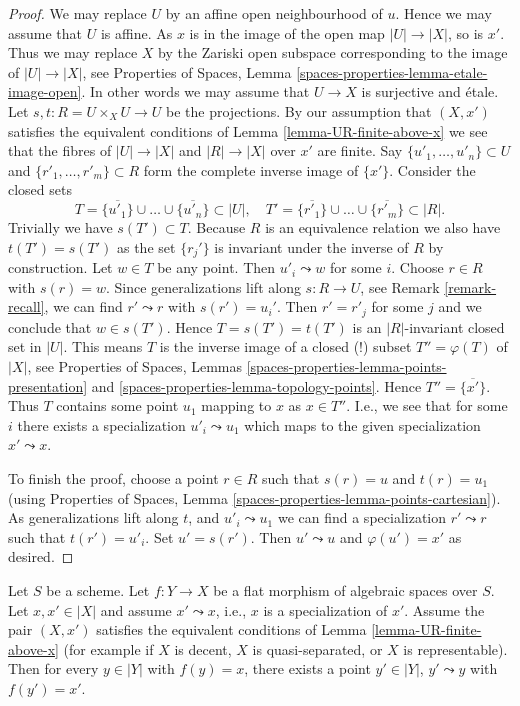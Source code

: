 \begin{proof}
We may replace $U$ by an affine open neighbourhood of $u$.
Hence we may assume that $U$ is affine. As $x$ is in the
image of the open map $|U| \to |X|$, so is $x'$. Thus we may
replace $X$ by the Zariski open subspace corresponding to
the image of $|U| \to |X|$, see
Properties of Spaces,
Lemma \ref{spaces-properties-lemma-etale-image-open}.
In other words we may assume that
$U \to X$ is surjective and \'etale.
Let $s, t : R = U \times_X U \to U$ be the projections.
By our assumption that $(X, x')$ satisfies the equivalent conditions of
Lemma \ref{lemma-UR-finite-above-x}
we see that the fibres of $|U| \to |X|$ and $|R| \to |X|$
over $x'$ are finite. Say $\{u'_1, \ldots, u'_n\} \subset U$ and
$\{r'_1, \ldots, r'_m\} \subset R$ form the complete inverse image
of $\{x'\}$.
Consider the closed sets
$$
T = \overline{\{u'_1\}} \cup \ldots \cup \overline{\{u'_n\}} \subset |U|,
\quad
T' = \overline{\{r'_1\}} \cup \ldots \cup \overline{\{r'_m\}} \subset |R|.
$$
Trivially we have $s(T') \subset T$. Because $R$ is an equivalence
relation we also have $t(T') = s(T')$ as the set $\{r_j'\}$
is invariant under the inverse of $R$ by construction. Let $w \in T$
be any point. Then $u'_i \leadsto w$ for some $i$. Choose $r \in R$
with $s(r) = w$. Since generalizations lift along $s : R \to U$, see
Remark \ref{remark-recall}, we can find $r' \leadsto r$ with
$s(r') = u_i'$. Then $r' = r'_j$ for some $j$ and we conclude that
$w \in s(T')$. Hence $T = s(T') = t(T')$ is an $|R|$-invariant closed
set in $|U|$. This means $T$ is the inverse image of a closed (!)
subset $T'' = \varphi(T)$ of $|X|$, see
Properties of Spaces,
Lemmas \ref{spaces-properties-lemma-points-presentation} and
\ref{spaces-properties-lemma-topology-points}.
Hence $T'' = \overline{\{x'\}}$.
Thus $T$ contains some point $u_1$ mapping to $x$ as $x \in T''$.
I.e., we see that for some $i$ there exists a specialization
$u'_i \leadsto u_1$ which maps to the given specialization
$x' \leadsto x$.

\medskip\noindent
To finish the proof, choose a point $r \in R$ such that
$s(r) = u$ and $t(r) = u_1$ (using
Properties of Spaces,
Lemma \ref{spaces-properties-lemma-points-cartesian}).
As generalizations lift along $t$, and $u'_i \leadsto u_1$
we can find a specialization $r' \leadsto r$ such that $t(r') = u'_i$.
Set $u' = s(r')$. Then $u' \leadsto u$ and $\varphi(u') = x'$ as
desired.
\end{proof}

\begin{lemma}
\label{lemma-generalizations-lift-flat}
Let $S$ be a scheme. Let $f : Y \to X$ be a  flat morphism of algebraic spaces
over $S$. Let $x, x' \in |X|$ and assume $x' \leadsto x$, i.e., $x$ is a
specialization of $x'$. Assume the pair $(X, x')$ satisfies the equivalent
conditions of Lemma \ref{lemma-UR-finite-above-x} (for example if
$X$ is decent, $X$ is quasi-separated, or $X$ is representable).
Then for every $y \in |Y|$ with $f(y) = x$, there exists a point $y' \in |Y|$,
$y' \leadsto y$ with $f(y') = x'$.
\end{lemma}

